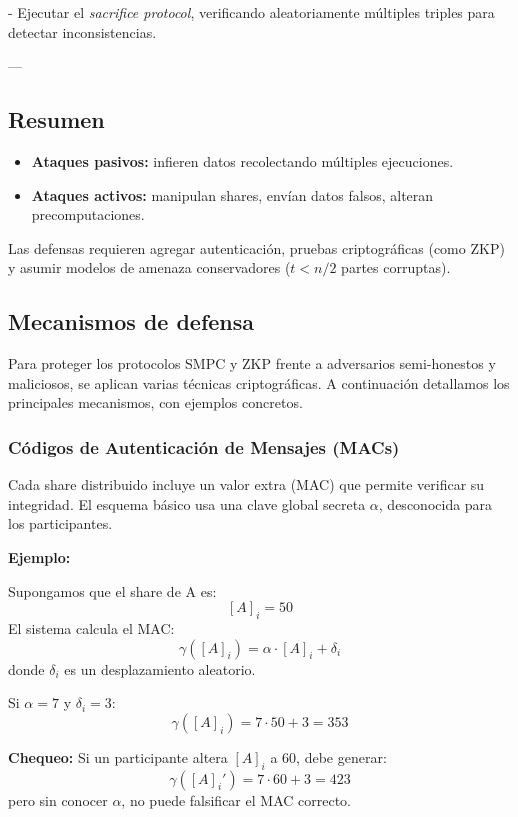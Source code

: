 \documentclass{article}
\begin{document}
- Ejecutar el \textit{sacrifice protocol}, verificando aleatoriamente múltiples triples para detectar inconsistencias.

---

\subsection{Resumen}

\begin{itemize}
    \item \textbf{Ataques pasivos:} infieren datos recolectando múltiples ejecuciones.
    \item \textbf{Ataques activos:} manipulan shares, envían datos falsos, alteran precomputaciones.
\end{itemize}

Las defensas requieren agregar autenticación, pruebas criptográficas (como ZKP) y asumir modelos de amenaza conservadores (\( t < n/2 \) partes corruptas).

\subsection{Mecanismos de defensa}

Para proteger los protocolos SMPC y ZKP frente a adversarios semi-honestos y maliciosos, se aplican varias técnicas criptográficas. A continuación detallamos los principales mecanismos, con ejemplos concretos.

\subsubsection{Códigos de Autenticación de Mensajes (MACs)}

Cada share distribuido incluye un valor extra (MAC) que permite verificar su integridad. El esquema básico usa una clave global secreta \( \alpha \), desconocida para los participantes.

\textbf{Ejemplo:}

Supongamos que el share de A es:
\[
[A]_i = 50
\]
El sistema calcula el MAC:
\[
\gamma([A]_i) = \alpha \cdot [A]_i + \delta_i
\]
donde \( \delta_i \) es un desplazamiento aleatorio.

Si \( \alpha = 7 \) y \( \delta_i = 3 \):
\[
\gamma([A]_i) = 7 \cdot 50 + 3 = 353
\]

\textbf{Chequeo:}  
Si un participante altera \( [A]_i \) a 60, debe generar:
\[
\gamma([A]_i') = 7 \cdot 60 + 3 = 423
\]
pero sin conocer \( \alpha \), no puede falsificar el MAC correcto.
\end{document}
